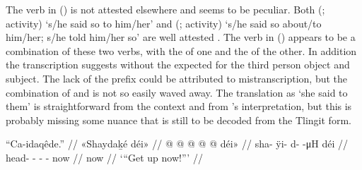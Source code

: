 The verb in (\lastx) is not attested elsewhere and seems to be peculiar.
Both  (;  activity) ‘s/he said so to him/her’ and  (;  activity) ‘s/he said so about/to him/her; s/he told him/her so’ are well attested \parencite[856, 858]{leer:1976}.
The verb in (\lastx) appears to be a combination of these two verbs, with the  of one and the  of the other.
In addition the transcription  suggests  without the expected  for the third person object and subject.
The lack of the  prefix could be attributed to mistranscription, but the combination of  and  is not so easily waved away.
The translation as ‘she said to them’ is straightforward from the context and from \citeauthor{swanton:1909}’s interpretation, but this is probably missing some nuance that is still to be decoded from the Tlingit form.

\ex\label{ex:92-40-get-up-now}%
%
\begingl
	\glpreamble	“Ca-idaqêde.” //
	\glpreamble	«\!Shaydaḵé déi\!» //
	\gla	{} @ {} @ {} @ {} @ {} @ {} déi\!» //
	\glb	\pqp{}sha- {} ÿi- d-  -μH déi //
	\glc	\pqp{}head- \· - -  -
		now //
	\gld	\pqp{} {} {} {} {} {}
		now //
	\glft	‘“Get up now!”’
		//
\endgl
\xe

